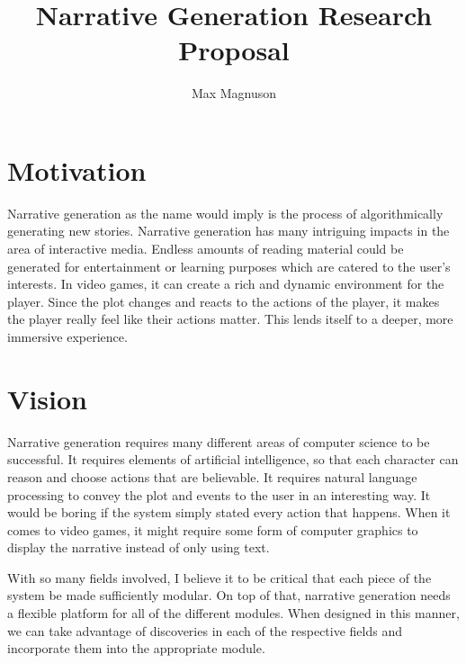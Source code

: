 \documentclass[]{article}
\title{Narrative Generation Research Proposal}
\author{Max Magnuson}
\begin{document}
\maketitle

\section{Motivation}
Narrative generation as the name would imply is the process of algorithmically generating new stories. Narrative generation has many intriguing impacts in the area of interactive media. Endless amounts of reading material could be generated for entertainment or learning purposes which are catered to the user's interests. In video games, it can create a rich and dynamic environment for the player. Since the plot changes and reacts to the actions of the player, it makes the player really feel like their actions matter. This lends itself to a deeper, more immersive experience.

\section{Vision}
Narrative generation requires many different areas of computer science to be successful. It requires elements of artificial intelligence, so that each character can reason and choose actions that are believable. It requires natural language processing to convey the plot and events to the user in an interesting way. It would be boring if the system simply stated every action that happens. When it comes to video games, it might require some form of computer graphics to display the narrative instead of only using text. 

With so many fields involved, I believe it to be critical that each piece of the system be made sufficiently modular. On top of that, narrative generation needs a flexible platform for all of the different modules. When designed in this manner, we can take advantage of discoveries in each of the respective fields and incorporate them into the appropriate module. 



\end{document}
